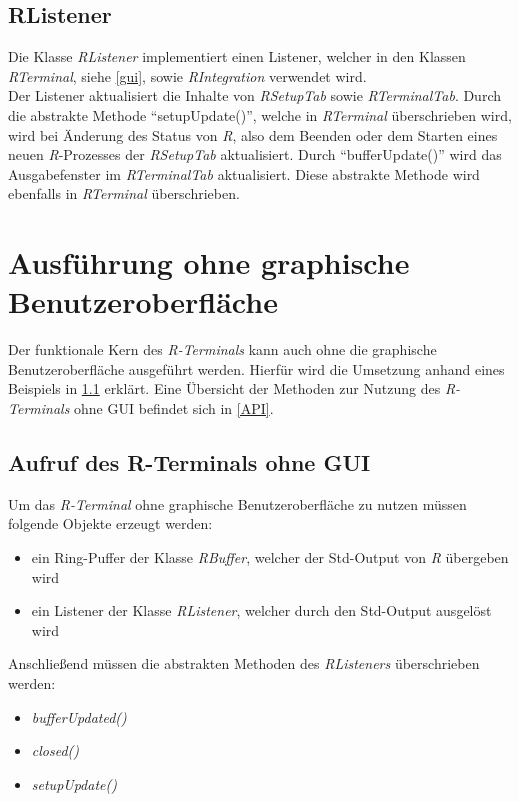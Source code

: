 \documentclass[a4paper, 12pt]{report} %
\begin{document}
\subsection{RListener} \label{RListener}

Die Klasse \textit{RListener} implementiert einen Listener, welcher in den Klassen \textit{RTerminal}, siehe \ref{gui}, sowie \textit{RIntegration} verwendet wird. \\

Der Listener aktualisiert die Inhalte von \textit{RSetupTab} sowie \textit{RTerminalTab}. 
Durch die abstrakte Methode "`setupUpdate()"', welche in \textit{RTerminal} überschrieben wird, wird bei Änderung des Status von \textit{R}, also dem Beenden oder dem Starten eines neuen \textit{R}-Prozesses der \textit{RSetupTab} aktualisiert.
Durch "`bufferUpdate()"' wird das Ausgabefenster im \textit{RTerminalTab} aktualisiert. Diese abstrakte Methode wird ebenfalls in \textit{RTerminal} überschrieben.



\section{Ausführung ohne graphische Benutzeroberfläche} \label{ohne GUI}

Der funktionale Kern des \textit{R-Terminals} kann auch ohne die graphische Benutzeroberfläche ausgeführt werden. 
Hierfür wird die Umsetzung anhand eines Beispiels in \ref{BeispielOhneGUI} erklärt. 
Eine Übersicht der Methoden zur Nutzung des \textit{R-Terminals} ohne GUI befindet sich in \ref{API}.

\subsection{Aufruf des R-Terminals ohne GUI} \label{BeispielOhneGUI}

Um das \textit{R-Terminal} ohne graphische Benutzeroberfläche zu nutzen müssen folgende Objekte erzeugt werden:
\begin{itemize}
	\item ein Ring-Puffer der Klasse \textit{RBuffer}, welcher der Std-Output von \textit{R} übergeben wird
	\item ein Listener der Klasse \textit{RListener}, welcher durch den Std-Output ausgelöst wird
\end{itemize}
	
Anschließend müssen die abstrakten Methoden des \textit{RListeners} überschrieben werden:
	\begin{itemize}
		\item \textit{bufferUpdated()}
		\item \textit{closed()}
		\item \textit{setupUpdate()}
	\end{itemize}
\end{document}
